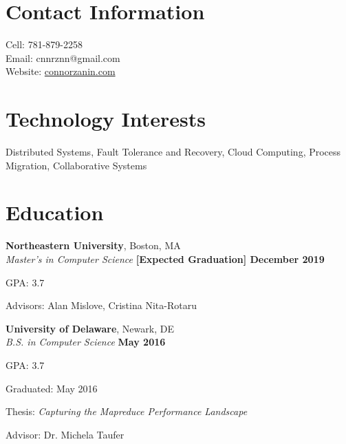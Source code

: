 \documentclass[margin,line]{resume}
\newif\ifReferences
\newif\ifOnline
\begin{document}
\Referencesfalse
\Onlinefalse


\begin{resume}


\section{\mysidestyle Contact Information}
\ifOnline
	Email: cnnrznn@gmail.com	 							\hfill Boston, MA\\
\else
   	\mbox{} \hfill Cell: 781-879-2258\\
   	\mbox{} \hfill Email: cnnrznn@gmail.com\\
    \mbox{} \hfill Website: \url{connorzanin.com}\\
\fi
   




\section{\mysidestyle Technology Interests}
Distributed Systems, Fault Tolerance and Recovery, Cloud Computing, Process Migration, Collaborative Systems


\section{\mysidestyle Education}
\textbf{Northeastern University}, Boston, MA \vspace{1mm}\\%
\textsl{Master's in Computer Science} \hfill \textbf{[Expected Graduation] December 2019}
\vspace{-3mm}\\\vspace{-1mm}%
\begin{list2}
	\item GPA: 3.7
	\item Advisors: Alan Mislove, Cristina Nita-Rotaru
\end{list2}

\textbf{University of Delaware}, Newark, DE \vspace{1mm}\\%
\textsl{B.S. in Computer Science} \hfill \textbf{May 2016}\vspace{-3mm}\\\vspace{-1mm}%
\begin{list2}
	\item GPA: 3.7
    \item Graduated: May 2016
    \item Thesis: \textsl{Capturing the Mapreduce Performance Landscape}
    \item Advisor:  Dr. Michela Taufer
\end{list2}\vspace{-1.5mm}    



\end{resume}
\end{document}
